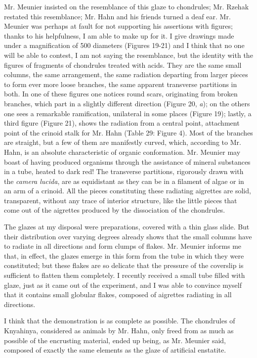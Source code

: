 \documentclass[a4paper, 12pt, oneside]{article}
\begin{document}
Mr. Meunier insisted on the resemblance of this glaze to chondrules; Mr. Rzehak restated this resemblance; Mr. Hahn and his friends turned a deaf ear. Mr. Meunier was perhaps at fault for not supporting his assertions with figures; thanks to his helpfulness, I am able to make up for it. I give drawings made under a magnification of 500 diameters (Figures 19-21) and I think that no one will be able to contest, I am not saying the resemblance, but the identity with the figures of fragments of chondrules treated with acids. They are the same small columns, the same arrangement, the same radiation departing from larger pieces to form ever more loose branches, the same apparent transverse partitions in both. In one of these figures one notices round scars, originating from broken branches, which part in a slightly different direction (Figure 20, \emph{a}); on the others one sees a remarkable ramification, unilateral in some places (Figure 19); lastly, a third figure (Figure 21), shows the radiation from a central point, attachment point of the crinoid stalk for Mr. Hahn (Table 29: Figure 4). Most of the branches are straight, but a few of them are manifestly curved, which, according to Mr. Hahn, is an absolute characteristic of organic conformation. Mr. Meunier may boast of having produced organisms through the assistance of mineral substances in a tube, heated to dark red! The transverse partitions, rigorously drawn with the \emph{camera lucida}, are as equidistant as they can be in a filament of algae or in an arm of a crinoid. All the pieces constituting these radiating aigrettes are solid, transparent, without any trace of interior structure, like the little pieces that come out of the aigrettes produced by the dissociation of the chondrules.

The glazes at my disposal were preparations, covered with a thin glass slide. But their distribution over varying degrees already shows that the small columns have to radiate in all directions and form clumps of flakes. Mr. Meunier informs me that, in effect, the glazes emerge in this form from the tube in which they were constituted; but these flakes are so delicate that the pressure of the coverslip is sufficient to flatten them completely. I recently received a small tube filled with glaze, just as it came out of the experiment, and I was able to convince myself that it contains small globular flakes, composed of aigrettes radiating in all directions.

I think that the demonstration is as complete as possible. The chondrules of Knyahinya, considered as animals by Mr. Hahn, only freed from as much as possible of the encrusting material, ended up being, as Mr. Meunier said, composed of exactly the same elements as the glaze of artificial enstatite.
\end{document}
